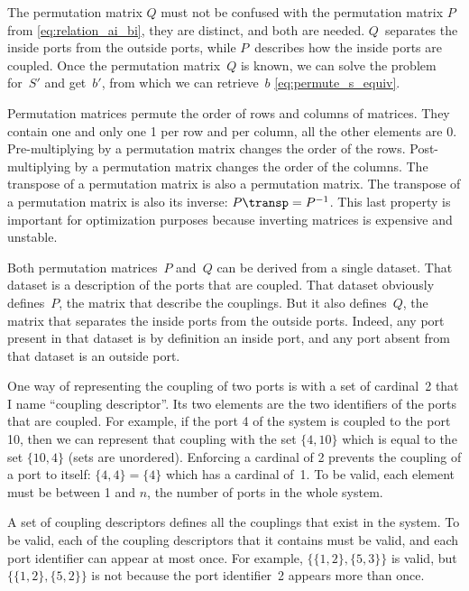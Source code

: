 The permutation matrix $Q$ must not be confused with the permutation matrix $P$ from \cref{eq:relation_ai_bi}, they are distinct, and both are needed.
$Q$~separates the inside ports from the outside ports, while $P$~describes how the inside ports are coupled.
Once the permutation matrix~$Q$ is known, we can solve the problem for~$S'$ and get~$b'$, from which we can retrieve~$b$ \cref{eq:permute_s_equiv}.

Permutation matrices permute the order of rows and columns of matrices.
They contain one and only one 1 per row and per column, all the other elements are 0.
Pre-multiplying by a permutation matrix changes the order of the rows.
Post-multiplying by a permutation matrix changes the order of the columns.
The transpose of a permutation matrix is also a permutation matrix.
The transpose of a permutation matrix is also its inverse: $P\transp = P^{-1}$.
This last property is important for optimization purposes because inverting matrices is expensive and unstable.

Both permutation matrices~$P$ and~$Q$ can be derived from a single dataset.
That dataset is a description of the ports that are coupled.
That dataset obviously defines~$P$, the matrix that describe the couplings.
But it also defines~$Q$, the matrix that separates the inside ports from the outside ports.
Indeed, any port present in that dataset is by definition an inside port, and any port absent from that dataset is an outside port.

One way of representing the coupling of two ports is with a set of cardinal~2 that I name ``coupling descriptor''.
Its two elements are the two identifiers of the ports that are coupled.
For example, if the port 4 of the system is coupled to the port 10, then we can represent that coupling with the set $\lbrace 4, 10\rbrace$ which is equal to the set $\lbrace 10, 4\rbrace$ (sets are unordered).
Enforcing a cardinal of 2 prevents the coupling of a port to itself: $\lbrace 4, 4\rbrace = \lbrace 4\rbrace$ which has a cardinal of~1.
To be valid, each element must be between 1 and $n$, the number of ports in the whole system.

A set of coupling descriptors defines all the couplings that exist in the system.
To be valid, each of the coupling descriptors that it contains must be valid, and each port identifier can appear at most once.
For example,
$\lbrace \lbrace 1, 2 \rbrace, \lbrace 5, 3 \rbrace \rbrace$
is valid, but 
$\lbrace \lbrace 1, 2 \rbrace, \lbrace 5, 2 \rbrace \rbrace$
is not because the port identifier~2 appears more than once.

